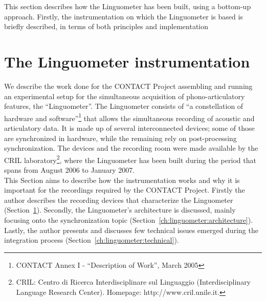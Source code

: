 This section describes how the Linguometer has been built, using a bottom-up
approach. 
Firstly, the instrumentation on which the Linguometer is based is briefly
described, in terms of both principles and implementation



\section{The Linguometer instrumentation}
\label{ch:linguometer:instrumentation}

We describe the work done for the CONTACT
Project assembling and running an experimental setup for the simultaneous 
acquisition of phono-articulatory features, the ``Linguometer''.
%
The Linguometer consists of ``a constellation of hardware and
software''\footnote{CONTACT Annex I - ``Description of Work'',
March 2005} that allows the simultaneous recording of acoustic and articulatory
data.
It is made up of several interconnected devices; some of those are 
synchronized in hardware, while the remaining rely on post-processing
synchronization.
The devices and the recording room were made available by the CRIL 
laboratory\footnote{CRIL: Centro di Ricerca Interdisciplinare sul Linguaggio 
(Interdisciplinary Language Research Center).
Homepage: http://www.cril.unile.it.},
where the Linguometer has been built during the period that spans
from August 2006 to January 2007.\\
This Section aims to describe how the instrumentation works and why it is
important for the recordings required by the CONTACT Project.
Firstly the author describes the recording devices that characterize the
Linguometer (Section~\ref{ch:linguometer:instrumentation}).
Secondly, the Linguometer's architecture is discussed, mainly focusing onto the
synchronization topic (Section~\ref{ch:linguometer:architecture}).
Lastly, the author presents and discusses few technical issues emerged during
the integration process (Section~\ref{ch:linguometer:technical}).
